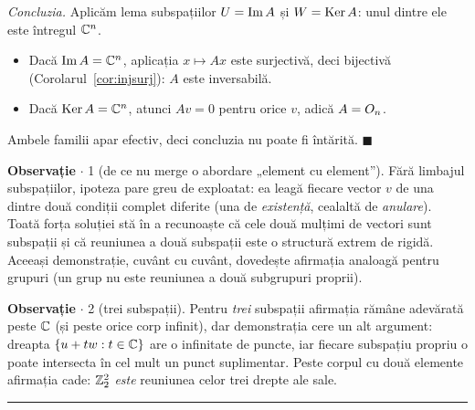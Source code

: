 \medskip
\emph{Concluzia.} Aplicăm lema subspațiilor $U = \operatorname{Im} A$ și $W = \operatorname{Ker} A$: unul dintre ele este întregul $\mathbb{C}^n$.
\begin{itemize}
  \item[---] Dacă $\operatorname{Im} A = \mathbb{C}^n$, aplicația $x \mapsto Ax$ este surjectivă, deci bijectivă (Corolarul~\ref{cor:injsurj}): $A$ este inversabilă.
  \item[---] Dacă $\operatorname{Ker} A = \mathbb{C}^n$, atunci $Av = 0$ pentru orice $v$, adică $A = O_n$.
\end{itemize}
Ambele familii apar efectiv, deci concluzia nu poate fi întărită. $\blacksquare$

\medskip
\textbf{Observație} $\cdot$ 1 (de ce nu merge o abordare „element cu element''). Fără limbajul subspațiilor, ipoteza pare greu de exploatat: ea leagă fiecare vector $v$ de una dintre două condiții complet diferite (una de \emph{existență}, cealaltă de \emph{anulare}). Toată forța soluției stă în a recunoaște că cele două mulțimi de vectori sunt subspații și că reuniunea a două subspații este o structură extrem de rigidă. Aceeași demonstrație, cuvânt cu cuvânt, dovedește afirmația analoagă pentru grupuri (un grup nu este reuniunea a două subgrupuri proprii).

\medskip
\textbf{Observație} $\cdot$ 2 (trei subspații). Pentru \emph{trei} subspații afirmația rămâne adevărată peste $\mathbb{C}$ (și peste orice corp infinit), dar demonstrația cere un alt argument: dreapta $\{u + tw : t \in \mathbb{C}\}$ are o infinitate de puncte, iar fiecare subspațiu propriu o poate intersecta în cel mult un punct suplimentar. Peste corpul cu două elemente afirmația cade: $\mathbb{Z}_2^2$ \emph{este} reuniunea celor trei drepte ale sale.
\vspace{1mm}\hrule

